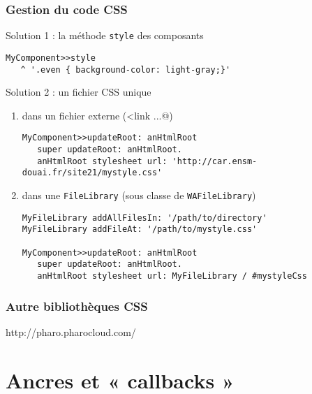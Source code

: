 \documentclass[9pt,compress]{beamer}
\newcommand{\code}[1]{\texttt{\textup{\NoAutoSpaceBeforeFDP #1\AutoSpaceBeforeFDP}}} %
\begin{document}
\begin{frame}[containsverbatim]\frametitle{Gestion du code CSS}
	
	\begin{block}{Solution 1 : la méthode \code{style} des composants}
\begin{verbatim}
MyComponent>>style 
   ^ '.even { background-color: light-gray;}'
\end{verbatim}
	\end{block}
	
	\begin{block}{Solution 2 : un fichier CSS unique}
		\begin{enumerate}
			\item dans un fichier externe (\verb@<link ...@)
\begin{verbatim}
MyComponent>>updateRoot: anHtmlRoot
   super updateRoot: anHtmlRoot.
   anHtmlRoot stylesheet url: 'http://car.ensm-douai.fr/site21/mystyle.css'
\end{verbatim}
			\item dans une \texttt{FileLibrary} (sous classe de \code{WAFileLibrary})
\begin{verbatim}
MyFileLibrary addAllFilesIn: '/path/to/directory'
MyFileLibrary addFileAt: '/path/to/mystyle.css'

MyComponent>>updateRoot: anHtmlRoot
   super updateRoot: anHtmlRoot.
   anHtmlRoot stylesheet url: MyFileLibrary / #mystyleCss
\end{verbatim}
	
		\end{enumerate}
	\end{block}
\end{frame}


\begin{frame}[containsverbatim]\frametitle{Autre bibliothèques CSS}

\begin{center}
\Large
http://pharo.pharocloud.com/
\end{center}

\end{frame}

\section{Ancres et « callbacks »} %
\end{document}
